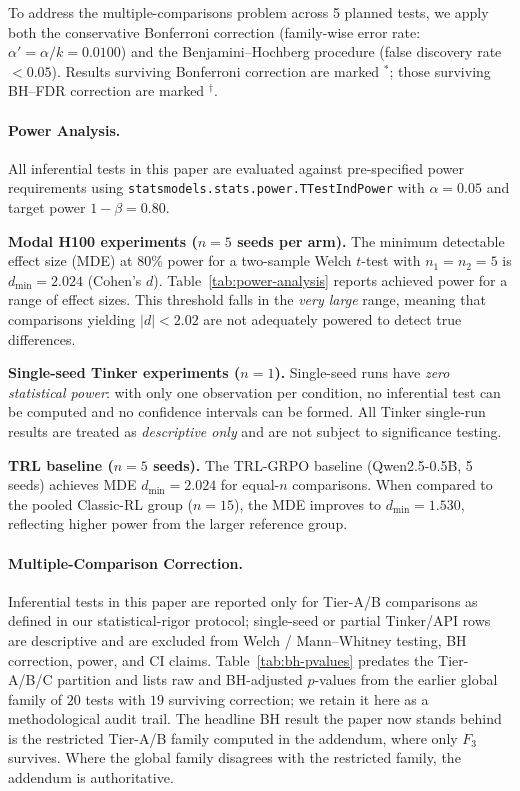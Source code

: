 \documentclass{article}
\begin{document}
To address the multiple-comparisons problem across 5 planned tests,
we apply both the conservative Bonferroni correction (family-wise error rate:
$\alpha' = \alpha / k = 0.0100$) and the Benjamini--Hochberg procedure
(false discovery rate $< 0.05$). Results surviving Bonferroni correction are
marked $^*$; those surviving BH--FDR correction are marked $^\dag$.

\paragraph{Power Analysis.}
All inferential tests in this paper are evaluated against pre-specified power
requirements using \texttt{statsmodels.stats.power.TTestIndPower} with
$\alpha = 0.05$ and target power $1 - \beta = 0.80$.

\textbf{Modal H100 experiments ($n = 5$ seeds per arm).}
The minimum detectable effect size (MDE) at 80\% power for a two-sample
Welch $t$-test with $n_1 = n_2 = 5$ is
$d_{\min} = 2.024$ (Cohen's $d$).
Table~\ref{tab:power-analysis} reports achieved power for a range of effect sizes.
This threshold falls in the \emph{very large} range, meaning that
comparisons yielding $|d| < 2.02$
are not adequately powered to detect true differences.

\textbf{Single-seed Tinker experiments ($n = 1$).}
Single-seed runs have \emph{zero statistical power}: with only one observation per
condition, no inferential test can be computed and no confidence intervals can be
formed.  All Tinker single-run results are treated as \emph{descriptive only} and
are not subject to significance testing.

\textbf{TRL baseline ($n = 5$ seeds).}
The TRL-GRPO baseline (Qwen2.5-0.5B, 5 seeds) achieves MDE
$d_{\min} = 2.024$ for equal-$n$ comparisons.
When compared to the pooled Classic-RL group ($n = 15$), the MDE
improves to $d_{\min} = 1.530$,
reflecting higher power from the larger reference group.

\paragraph{Multiple-Comparison Correction.}
Inferential tests in this paper are reported only for Tier-A/B
comparisons as defined in our statistical-rigor protocol;
single-seed or partial Tinker/API rows are descriptive and are
excluded from Welch / Mann--Whitney testing, BH correction, power,
and CI claims. Table~\ref{tab:bh-pvalues} predates the Tier-A/B/C
partition and lists raw and BH-adjusted $p$-values from the
earlier global family of $20$ tests with $19$ surviving correction;
we retain it here as a methodological audit trail. The headline
BH result the paper now stands behind is the restricted Tier-A/B
family computed in the addendum, where only $F_3$ survives. Where
the global family disagrees with the restricted family, the
addendum is authoritative.
\end{document}
